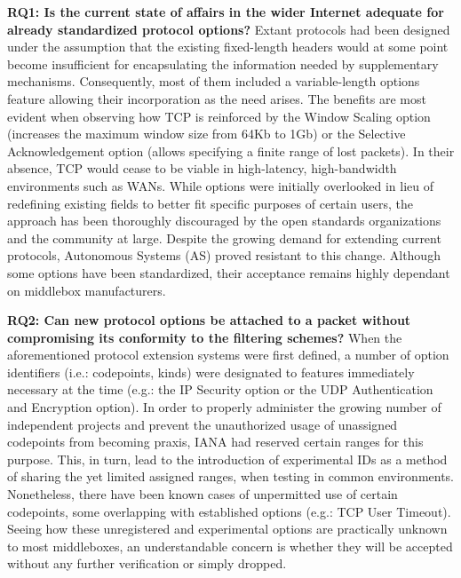 \textbf{RQ1: Is the current state of affairs in the wider Internet adequate for already standardized protocol options?}
Extant protocols had been designed under the assumption that the existing fixed-length headers would at some point become insufficient for encapsulating the information needed by supplementary mechanisms. Consequently, most of them included a variable-length options feature allowing their incorporation as the need arises. The benefits are most evident when observing how TCP is reinforced by the Window Scaling option (increases the maximum window size from 64Kb to 1Gb) or the Selective Acknowledgement option (allows specifying a finite range of lost packets). In their absence, TCP would cease to be viable in high-latency, high-bandwidth environments such as WANs. While options were initially overlooked in lieu of redefining existing fields to better fit specific purposes of certain users, the approach has been thoroughly discouraged by the open standards organizations and the community at large. Despite the growing demand for extending current protocols, Autonomous Systems (AS) proved resistant to this change. Although some options have been standardized, their acceptance remains highly dependant on middlebox manufacturers.

\textbf{RQ2: Can new protocol options be attached to a packet without compromising its conformity to the filtering schemes?}
When the aforementioned protocol extension systems were first defined, a number of option identifiers (i.e.: codepoints, kinds) were designated to features immediately necessary at the time (e.g.: the IP Security option or the UDP Authentication and Encryption option). In order to properly administer the growing number of independent projects and prevent the unauthorized usage of unassigned codepoints from becoming praxis, IANA had reserved certain ranges for this purpose. This, in turn, lead to the introduction of experimental IDs as a method of sharing the yet limited assigned ranges, when testing in common environments. Nonetheless, there have been known cases of unpermitted use of certain codepoints, some overlapping with established options (e.g.: TCP User Timeout). Seeing how these unregistered and experimental options are practically unknown to most middleboxes, an understandable concern is whether they will be accepted without any further verification or simply dropped.

